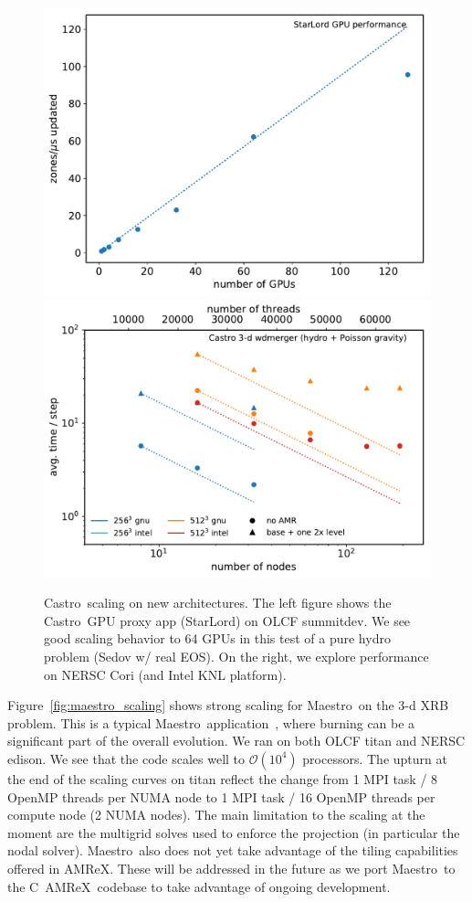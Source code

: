 \documentclass[a4paper]{jpconf}
\newcommand{\maestro}{{\sffamily Maestro}}
\newcommand{\castro}{{\sffamily Castro}}
\newcommand{\starlord}{{\sffamily StarLord}}
\newcommand{\amrex}{{\sffamily AMReX}}
\newcommand{\cpp}{C\nolinebreak\hspace{-.05em}\raisebox{.4ex}{\tiny\bf +}\nolinebreak\hspace{-.10em}\raisebox{.4ex}{\tiny\bf +}}
\begin{document}
\begin{figure}[t]
\centering
\includegraphics[width=0.48\linewidth]{summitdev_scaling}
\includegraphics[width=0.48\linewidth]{cori_scaling}
\caption{\label{fig:knl-gpu-scaling} \castro\ scaling on new
  architectures.  The left figure shows the \castro\ GPU proxy app
  (\starlord) on OLCF summitdev.  We see good scaling behavior to 64
  GPUs in this test of a pure hydro problem (Sedov w/ real EOS).  On the
right, we explore performance on NERSC Cori (and Intel KNL platform).}
\end{figure}

Figure~\ref{fig:maestro_scaling} shows strong scaling for \maestro\ on
the 3-d XRB problem.  This is a typical
\maestro\ application~\cite{xrb3}, where burning can be a significant
part of the overall evolution.  We ran on both OLCF titan and NERSC
edison.  We see that the code scales well to $\mathcal{O}(10^4)$
processors.  The upturn at the end of the scaling curves on titan
reflect the change from 1 MPI task / 8 OpenMP threads per NUMA node to
1 MPI task / 16 OpenMP threads per compute node (2 NUMA nodes).  The
main limitation to the scaling at the moment are the multigrid solves
used to enforce the projection (in particular the nodal solver).
\maestro\ also does not yet take advantage of the tiling capabilities
offered in \amrex.  These will be addressed in the future as we port
\maestro\ to the \cpp\ \amrex\ codebase to take advantage of ongoing
development.
\end{document}
